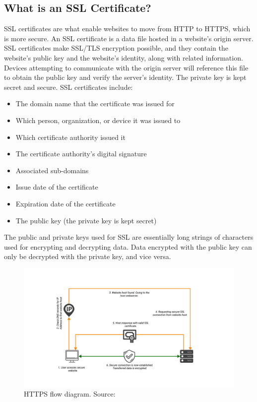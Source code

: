 \subsection{What is an SSL Certificate?}\label{subsec:what-is-an-ssl-certificate?}
SSL certificates are what enable websites to move from HTTP to HTTPS, which is more secure.
An SSL certificate is a data file hosted in a website's origin server.
SSL certificates make SSL/TLS encryption possible, and they contain the website's public key and the website's identity,
along with related information.
Devices attempting to communicate with the origin server will reference this file to obtain the public key and verify
the server's identity.
The private key is kept secret and secure.
SSL certificates include:
\begin{itemize}
    \item The domain name that the certificate was issued for
    \item Which person, organization, or device it was issued to
    \item Which certificate authority issued it
    \item The certificate authority's digital signature
    \item Associated sub-domains
    \item Issue date of the certificate
    \item Expiration date of the certificate
    \item The public key (the private key is kept secret)
\end{itemize}
The public and private keys used for SSL are essentially long strings of characters used for encrypting and decrypting data.
Data encrypted with the public key can only be decrypted with the private key, and vice versa.
\begin{figure}[H]
    \centering
    \includegraphics[width=1\textwidth]{Pictures/HTTPS_Flow}
    \caption{HTTPS flow diagram. Source: }\label{fig:figure6}
\end{figure}


